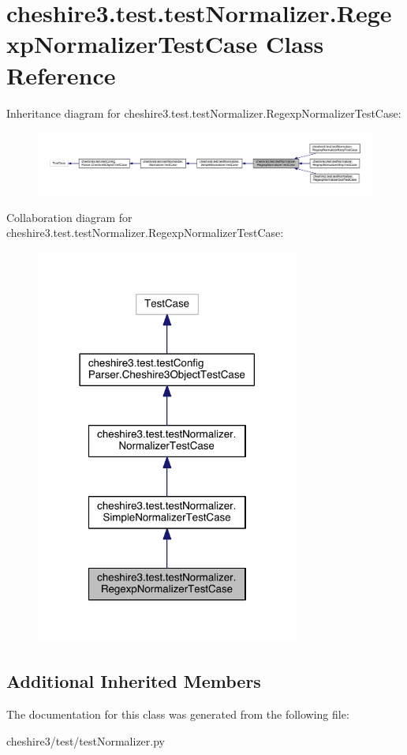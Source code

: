 \hypertarget{classcheshire3_1_1test_1_1test_normalizer_1_1_regexp_normalizer_test_case}{\section{cheshire3.\-test.\-test\-Normalizer.\-Regexp\-Normalizer\-Test\-Case Class Reference}
\label{classcheshire3_1_1test_1_1test_normalizer_1_1_regexp_normalizer_test_case}
}


Inheritance diagram for cheshire3.\-test.\-test\-Normalizer.\-Regexp\-Normalizer\-Test\-Case\-:
\nopagebreak
\begin{figure}[H]
\begin{center}
\leavevmode
\includegraphics[width=350pt]{classcheshire3_1_1test_1_1test_normalizer_1_1_regexp_normalizer_test_case__inherit__graph}
\end{center}
\end{figure}


Collaboration diagram for cheshire3.\-test.\-test\-Normalizer.\-Regexp\-Normalizer\-Test\-Case\-:
\nopagebreak
\begin{figure}[H]
\begin{center}
\leavevmode
\includegraphics[width=246pt]{classcheshire3_1_1test_1_1test_normalizer_1_1_regexp_normalizer_test_case__coll__graph}
\end{center}
\end{figure}
\subsection*{Additional Inherited Members}


The documentation for this class was generated from the following file\-:\begin{DoxyCompactItemize}
\item 
cheshire3/test/test\-Normalizer.\-py\end{DoxyCompactItemize}
